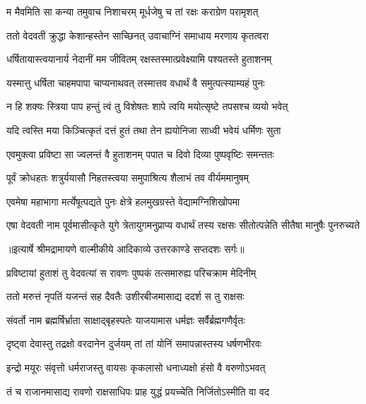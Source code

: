 \twolineshloka
{म मैवमिति सा कन्या तमुवाच निशाचरम्}
{मूर्धजेषु च तां रक्षः कराग्रेण परामृशत्} %

\twolineshloka
{ततो वेदवती क्रुद्धा केशान्हस्तेन साच्छिनत्}
{उवाचाग्निं समाधाय मरणाय कृतत्वरा} %

\twolineshloka
{धर्षितायास्त्वयानार्य नेदानीं मम जीवितम्}
{रक्षस्तस्मात्प्रवेक्ष्यामि पश्यतस्ते हुताशनम्} %

\twolineshloka
{यस्मात्तु धर्षिता चाहमपापा चाप्यनाथवत्}
{तस्मात्तव वधार्थं वै समुत्पत्स्याम्यहं पुनः} %

\twolineshloka
{न हि शक्यः स्त्रिया पाप हन्तुं त्वं तु विशेषतः}
{शापे त्वयि मयोत्सृष्टे तपसश्च व्ययो भवेत्} %

\twolineshloka
{यदि त्वस्ति मया किञ्चित्कृतं दत्तं हुतं तथा}
{तेन ह्ययोनिजा साध्वी भवेयं धर्मिणः सुता} %

\twolineshloka
{एवमुक्त्वा प्रविष्टा सा ज्वलन्तं वै हुताशनम्}
{पपात च दिवो दिव्या पुष्पवृष्टिः समन्ततः} %

\twolineshloka
{पूर्वं क्रोधहतः शत्रुर्ययासौ निहतस्त्वया}
{समुपाश्रित्य शैलाभं तव वीर्यममानुषम्} %

\twolineshloka
{एवमेषा महाभागा मर्त्येषूत्पद्यते पुनः}
{क्षेत्रे हलमुखग्रस्ते वेद्यामग्निशिखोपमा} %

\threelineshloka
{एषा वेदवती नाम पूर्वमासीत्कृते युगे}
{त्रेतायुगमनुप्राप्य वधार्थं तस्य रक्षसः}
{सीतोत्पन्नेति सीतैषा मानुषैः पुनरुच्यते} %


{॥इत्यार्षे श्रीमद्रामायणे वाल्मीकीये आदिकाव्ये उत्तरकाण्डे सप्तदशः सर्गः॥}


\twolineshloka
{प्रविष्टायां हुताशं तु वेदवत्यां स रावणः}
{पुष्पकं तत्समारुह्य परिचक्राम मेदिनीम्} %

\twolineshloka
{ततो मरुत्तं नृपतिं यजन्तं सह दैवतैः}
{उशीरबीजमासाद्य ददर्श स तु राक्षसः} %

\twolineshloka
{संवर्तो नाम ब्रह्मर्षिर्भ्राता साक्षाद्बृहस्पतेः}
{याजयामास धर्मज्ञः सर्वैर्ब्रह्मगणैर्वृतः} %

\twolineshloka
{दृष्ट्वा देवास्तु तद्रक्षो वरदानेन दुर्जयम्}
{तां तां योनिं समापन्नास्तस्य धर्षणभीरवः} %

\twolineshloka
{इन्द्रो मयूरः संवृत्तो धर्मराजस्तु वायसः}
{कृकलासो धनाध्यक्षो हंसो वै वरुणोऽभवत्} %

\twolineshloka
{तं च राजानमासाद्य रावणो राक्षसाधिपः}
{प्राह युद्धं प्रयच्चेति निर्जितोऽस्मीति वा वद} %

